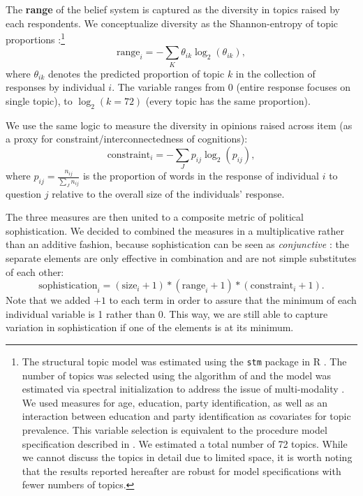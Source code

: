 \documentclass[12pt]{article}
\begin{document}
The \textbf{range} of the belief system is captured as the diversity in topics raised by each respondents. We conceptualize diversity as the Shannon-entropy of topic proportions \citep{shannon1948mathematical,munger2016elites}:\footnote{The structural topic model was estimated using the \texttt{stm} package in R \citep{roberts2014structural}. The number of topics was selected using the algorithm of \citet{lee2014low} and the model was estimated via spectral initialization to address the issue of multi-modality \citep[see][for details]{roberts2014stm}. We used measures for age, education, party identification, as well as an interaction between education and party identification as covariates for topic prevalence. This variable selection is equivalent to the procedure model specification described in \citet{roberts2014structural}. We estimated a total number of 72 topics. While we cannot discuss the topics in detail due to limited space, it is worth noting that the results reported hereafter are robust for model specifications with fewer numbers of topics.}
\begin{equation}
\text{range}_i = −\sum_K \theta_{ik} \log_2(\theta_{ik}),
\end{equation}
where $\theta_{ik}$ denotes the predicted proportion of topic $k$ in the collection of responses by individual $i$. The variable ranges from 0 (entire response focuses on single topic), to $\log_2(k=72)$ (every topic has the same proportion).

We use the same logic to measure the diversity in opinions raised across item (as a proxy for constraint/interconnectedness of cognitions):
\begin{equation}
\text{constraint}_i = −\sum_J p_{ij} \log_2(p_{ij}),
\end{equation}
where $p_{ij}=\tfrac{n_{ij}}{\sum_J n_{ij}}$ is the proportion of words in the response of individual $i$ to question $j$ relative to the overall size of the individuals' response.

The three measures are then united to a composite metric of political sophistication. We decided to combined the measures in a multiplicative rather than an additive fashion, because sophistication can be seen as \textit{conjunctive} \citep[see][]{luskin1987measuring}: the separate elements are only effective in combination and are not simple substitutes of each other:
\begin{equation}
\text{sophistication}_i = (\text{size}_i + 1) * (\text{range}_i + 1) * (\text{constraint}_i + 1).
\end{equation}
Note that we added $+1$ to each term in order to assure that the minimum of each individual variable is 1 rather than 0. This way, we are still able to capture variation in sophistication if one of the elements is at its minimum.
\end{document}
